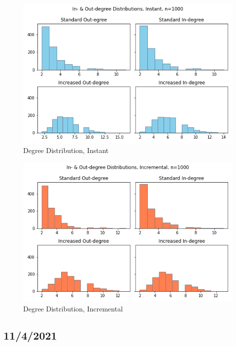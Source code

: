 \documentclass{article}
\begin{document}
\begin{center}
    \begin{figure}[!htbp]
        \centering
        \includegraphics[width=.8\textwidth]{ThesisKI/Images/InstantDegree.png}
        \caption{Degree Distribution, Instant}
        \label{degree:instant}
    \end{figure}
\end{center}
\begin{center}
    \begin{figure}[!htbp]
        \centering
        \includegraphics[width=.8\textwidth]{ThesisKI/Images/IncrementalDegree.png}
        \caption{Degree Distribution, Incremental}
        \label{degree:incremental}
    \end{figure}
\end{center}

\subsection{11/4/2021}
\end{document}
